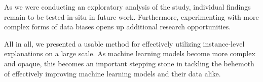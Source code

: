 As we were conducting an exploratory analysis of the study, individual findings remain to be tested in-situ in future work.
Furthermore, experimenting with more complex forms of data biases opens up additional research opportunities.

All in all, we presented a usable method for effectively utilizing instance-level explanations on a large scale.
As machine learning models become more complex and opaque, this becomes an important stepping stone in tackling the behemoth of effectively improving machine learning models and their data alike.
